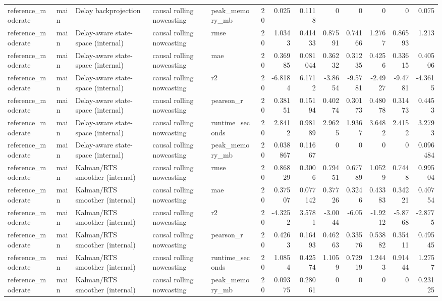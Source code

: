 \begin{table}[!htbp]
{{\begin{tabular}{lllllrrrrrrrr}
reference_moderate & main & Delay backprojection & causal rolling nowcasting & peak_memory_mb & 20 & 0.025 & 0.1118 & 0 & 0 & 0 & 0 & 0.075 \\
reference_moderate & main & Delay-aware state-space (internal) & causal rolling nowcasting & rmse & 20 & 1.0343 & 0.41433 & 0.87591 & 0.74166 & 1.2767 & 0.86593 & 1.213 \\
reference_moderate & main & Delay-aware state-space (internal) & causal rolling nowcasting & mae & 20 & 0.36985 & 0.081044 & 0.36232 & 0.31235 & 0.4256 & 0.33615 & 0.40506 \\
reference_moderate & main & Delay-aware state-space (internal) & causal rolling nowcasting & r2 & 20 & -6.8184 & 6.1712 & -3.8654 & -9.5781 & -2.4927 & -9.4781 & -4.3615 \\
reference_moderate & main & Delay-aware state-space (internal) & causal rolling nowcasting & pearson_r & 20 & 0.38151 & 0.15194 & 0.40274 & 0.30173 & 0.48078 & 0.31473 & 0.4453 \\
reference_moderate & main & Delay-aware state-space (internal) & causal rolling nowcasting & runtime_seconds & 20 & 2.8412 & 0.98189 & 2.9625 & 1.9367 & 3.6482 & 2.4152 & 3.2793 \\
reference_moderate & main & Delay-aware state-space (internal) & causal rolling nowcasting & peak_memory_mb & 20 & 0.038867 & 0.11667 & 0 & 0 & 0 & 0 & 0.096484 \\
reference_moderate & main & Kalman/RTS smoother (internal) & causal rolling nowcasting & rmse & 20 & 0.86829 & 0.3006 & 0.79451 & 0.67789 & 1.0529 & 0.7448 & 0.99504 \\
reference_moderate & main & Kalman/RTS smoother (internal) & causal rolling nowcasting & mae & 20 & 0.37507 & 0.077142 & 0.37726 & 0.3246 & 0.43383 & 0.34221 & 0.40754 \\
reference_moderate & main & Kalman/RTS smoother (internal) & causal rolling nowcasting & r2 & 20 & -4.3252 & 3.5781 & -3.0044 & -6.05 & -1.9212 & -5.8768 & -2.8775 \\
reference_moderate & main & Kalman/RTS smoother (internal) & causal rolling nowcasting & pearson_r & 20 & 0.4263 & 0.16493 & 0.46263 & 0.33576 & 0.53882 & 0.35411 & 0.49545 \\
reference_moderate & main & Kalman/RTS smoother (internal) & causal rolling nowcasting & runtime_seconds & 20 & 1.0854 & 0.42574 & 1.1059 & 0.72919 & 1.2443 & 0.91444 & 1.2757 \\
reference_moderate & main & Kalman/RTS smoother (internal) & causal rolling nowcasting & peak_memory_mb & 20 & 0.09375 & 0.28061 & 0 & 0 & 0 & 0 & 0.23125 \\

\end{tabular}}}
\end{table}
